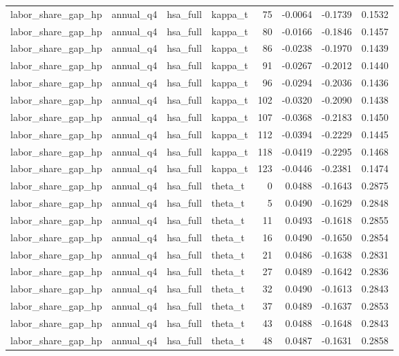 \begin{tabular}{llllrrrr}
labor\_share\_gap\_hp & annual\_q4 & hsa\_full & kappa\_t & 75 & -0.0064 & -0.1739 & 0.1532 \\
labor\_share\_gap\_hp & annual\_q4 & hsa\_full & kappa\_t & 80 & -0.0166 & -0.1846 & 0.1457 \\
labor\_share\_gap\_hp & annual\_q4 & hsa\_full & kappa\_t & 86 & -0.0238 & -0.1970 & 0.1439 \\
labor\_share\_gap\_hp & annual\_q4 & hsa\_full & kappa\_t & 91 & -0.0267 & -0.2012 & 0.1440 \\
labor\_share\_gap\_hp & annual\_q4 & hsa\_full & kappa\_t & 96 & -0.0294 & -0.2036 & 0.1436 \\
labor\_share\_gap\_hp & annual\_q4 & hsa\_full & kappa\_t & 102 & -0.0320 & -0.2090 & 0.1438 \\
labor\_share\_gap\_hp & annual\_q4 & hsa\_full & kappa\_t & 107 & -0.0368 & -0.2183 & 0.1450 \\
labor\_share\_gap\_hp & annual\_q4 & hsa\_full & kappa\_t & 112 & -0.0394 & -0.2229 & 0.1445 \\
labor\_share\_gap\_hp & annual\_q4 & hsa\_full & kappa\_t & 118 & -0.0419 & -0.2295 & 0.1468 \\
labor\_share\_gap\_hp & annual\_q4 & hsa\_full & kappa\_t & 123 & -0.0446 & -0.2381 & 0.1474 \\
labor\_share\_gap\_hp & annual\_q4 & hsa\_full & theta\_t & 0 & 0.0488 & -0.1643 & 0.2875 \\
labor\_share\_gap\_hp & annual\_q4 & hsa\_full & theta\_t & 5 & 0.0490 & -0.1629 & 0.2848 \\
labor\_share\_gap\_hp & annual\_q4 & hsa\_full & theta\_t & 11 & 0.0493 & -0.1618 & 0.2855 \\
labor\_share\_gap\_hp & annual\_q4 & hsa\_full & theta\_t & 16 & 0.0490 & -0.1650 & 0.2854 \\
labor\_share\_gap\_hp & annual\_q4 & hsa\_full & theta\_t & 21 & 0.0486 & -0.1638 & 0.2831 \\
labor\_share\_gap\_hp & annual\_q4 & hsa\_full & theta\_t & 27 & 0.0489 & -0.1642 & 0.2836 \\
labor\_share\_gap\_hp & annual\_q4 & hsa\_full & theta\_t & 32 & 0.0490 & -0.1613 & 0.2843 \\
labor\_share\_gap\_hp & annual\_q4 & hsa\_full & theta\_t & 37 & 0.0489 & -0.1637 & 0.2853 \\
labor\_share\_gap\_hp & annual\_q4 & hsa\_full & theta\_t & 43 & 0.0488 & -0.1648 & 0.2843 \\
labor\_share\_gap\_hp & annual\_q4 & hsa\_full & theta\_t & 48 & 0.0487 & -0.1631 & 0.2858 \\

\end{tabular}

